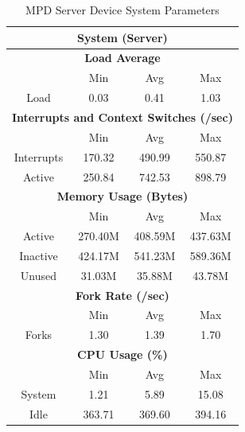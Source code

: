 \documentclass[11pt,a4paper]{scrreprt}
\begin{document}
\begin{table}[H]
\centering
    \begin{tabular}{||c|c|c|c|c|c|c||}
    \hline
    \multicolumn{7}{|c|}{\textbf{System (Server)}} \\
    \hline
    \multicolumn{7}{|c|}{\textbf{Load Average}} \\
    \hline\hline
      & \multicolumn{2}{|c|}{Min} & \multicolumn{2}{|c|}{Avg} & \multicolumn{2}{|c|}{Max} \\
    \hline
    Load & \multicolumn{2}{|c|}{0.03} & \multicolumn{2}{|c|}{0.41} & \multicolumn{2}{|c|}{1.03} \\
    \hline\hline
    \multicolumn{7}{|c|}{\textbf{Interrupts and Context Switches (/sec)}} \\
    \hline
      & \multicolumn{2}{|c|}{Min} & \multicolumn{2}{|c|}{Avg} & \multicolumn{2}{|c|}{Max} \\
    \hline
    Interrupts & \multicolumn{2}{|c|}{170.32} & \multicolumn{2}{|c|}{490.99} & \multicolumn{2}{|c|}{550.87} \\
    \hline
    Active & \multicolumn{2}{|c|}{250.84} & \multicolumn{2}{|c|}{742.53} & \multicolumn{2}{|c|}{898.79} \\
    \hline\hline
    \multicolumn{7}{|c|}{\textbf{Memory Usage (Bytes)}} \\
    \hline\hline
      & \multicolumn{2}{|c|}{Min} & \multicolumn{2}{|c|}{Avg} & \multicolumn{2}{|c|}{Max} \\
    \hline
    Active & \multicolumn{2}{|c|}{270.40M} & \multicolumn{2}{|c|}{408.59M} & \multicolumn{2}{|c|}{437.63M} \\
    \hline
    Inactive & \multicolumn{2}{|c|}{424.17M} & \multicolumn{2}{|c|}{541.23M} & \multicolumn{2}{|c|}{589.36M} \\
    \hline
    Unused & \multicolumn{2}{|c|}{31.03M} & \multicolumn{2}{|c|}{35.88M} & \multicolumn{2}{|c|}{43.78M} \\
    \hline\hline
    \multicolumn{7}{|c|}{\textbf{Fork Rate (/sec)}} \\
    \hline\hline
      & \multicolumn{2}{|c|}{Min} & \multicolumn{2}{|c|}{Avg} & \multicolumn{2}{|c|}{Max} \\
    \hline
    Forks & \multicolumn{2}{|c|}{1.30} & \multicolumn{2}{|c|}{1.39} & \multicolumn{2}{|c|}{1.70} \\
    \hline\hline
    \multicolumn{7}{|c|}{\textbf{CPU Usage (\%)}} \\
    \hline\hline
      & \multicolumn{2}{|c|}{Min} & \multicolumn{2}{|c|}{Avg} & \multicolumn{2}{|c|}{Max} \\
    \hline
    System & \multicolumn{2}{|c|}{1.21} & \multicolumn{2}{|c|}{5.89} & \multicolumn{2}{|c|}{15.08} \\
    \hline
    Idle & \multicolumn{2}{|c|}{363.71} & \multicolumn{2}{|c|}{369.60} & \multicolumn{2}{|c|}{394.16} \\
    \hline\hline
    \end{tabular}
    \caption{MPD Server Device System Parameters}
    \label{MPDserverSysTab}
\end{table}
\end{document}
